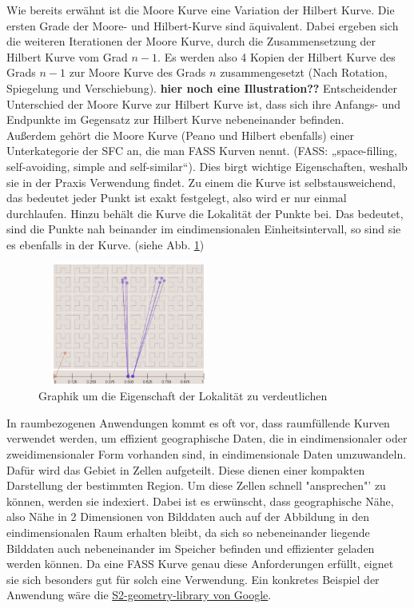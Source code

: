 \documentclass[course=erap]{aspdoc}
\begin{document}
Wie bereits erwähnt ist die Moore Kurve eine Variation der Hilbert Kurve. Die ersten Grade der Moore- und Hilbert-Kurve sind äquivalent. Dabei ergeben sich die weiteren Iterationen der Moore Kurve, durch die Zusammensetzung der Hilbert Kurve vom Grad $n - 1$.  Es werden also 4 Kopien der Hilbert Kurve des Grads $n-1$ zur Moore Kurve des Grads $n$ zusammengesetzt (Nach Rotation, Spiegelung und Verschiebung). \textbf{hier noch eine Illustration??}
Entscheidender Unterschied der Moore Kurve zur Hilbert Kurve ist, dass sich ihre Anfangs- und Endpunkte im Gegensatz zur Hilbert Kurve nebeneinander befinden.
\\
Außerdem gehört die Moore Kurve (Peano und Hilbert ebenfalls) einer Unterkategorie der SFC an, die man FASS Kurven nennt. (FASS: „space-filling, self-avoiding, simple and self-similar“).
Dies birgt wichtige Eigenschaften, weshalb sie in der Praxis Verwendung findet. Zu einem die Kurve ist selbstausweichend, das bedeutet jeder Punkt ist exakt festgelegt, also wird er nur einmal durchlaufen. Hinzu behält die Kurve die Lokalität der Punkte bei. Das bedeutet, sind die Punkte nah beinander im eindimensionalen Einheitsintervall, so sind sie es ebenfalls in der Kurve. (siehe Abb. \ref{fig:locality}) %
\begin{figure}[h]
\centering
      \includegraphics[width=6cm, height=4cm]{Locality}
    \caption{Graphik um die Eigenschaft der Lokalität zu verdeutlichen}
    \label{fig:locality}
\end{figure}
\newpage
In raumbezogenen Anwendungen kommt es oft vor, dass raumfüllende Kurven verwendet werden, um effizient geographische Daten, die in eindimensionaler oder zweidimensionaler Form vorhanden sind, in eindimensionale Daten umzuwandeln. Dafür wird das Gebiet in Zellen aufgeteilt. Diese dienen einer kompakten Darstellung der bestimmten Region. Um diese Zellen schnell "ansprechen"' zu können, werden sie indexiert. Dabei ist es erwünscht, dass geographische Nähe, also Nähe in 2 Dimensionen von Bilddaten auch auf der Abbildung in den eindimensionalen Raum erhalten bleibt, da sich so nebeneinander liegende Bilddaten auch nebeneinander im Speicher befinden und effizienter geladen werden können.
Da eine FASS Kurve genau diese Anforderungen erfüllt, eignet sie sich besonders gut für solch eine Verwendung. Ein konkretes Beispiel der Anwendung wäre die \href{https://code.google.com/archive/p/s2-geometry-library/}{S2-geometry-library von Google}. 
\end{document}
